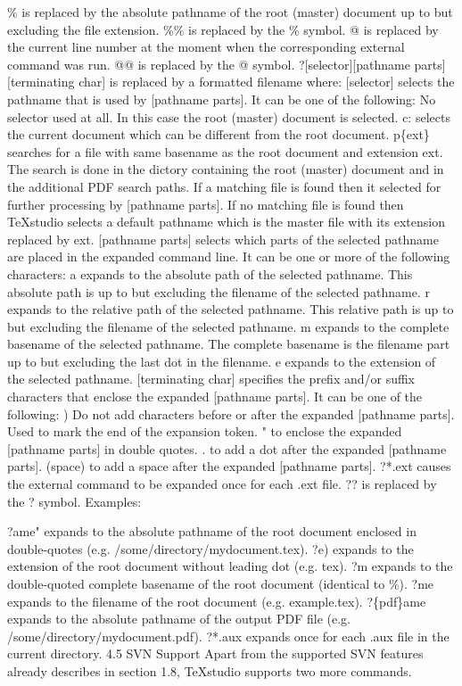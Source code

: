 \documentclass{article}
\begin{document}
	\% is replaced by the absolute pathname of the root (master) document up to but excluding the file extension.
	\%\% is replaced by the \% symbol.
	@ is replaced by the current line number at the moment when the corresponding external command was run.
	@@ is replaced by the @ symbol.
	?[selector][pathname parts][terminating char] is replaced by a formatted filename where:
	[selector] selects the pathname that is used by [pathname parts]. It can be one of the following:
	No selector used at all. In this case the root (master) document is selected.
	c: selects the current document which can be different from the root document.
	p\{ext\} searches for a file with same basename as the root document and extension ext. The search is done in the dictory containing the root (master) document and in the additional PDF search paths. If a matching file is found then it selected for further processing by [pathname parts]. If no matching file is found then TeXstudio selects a default pathname which is the master file with its extension replaced by ext.
	[pathname parts] selects which parts of the selected pathname are placed in the expanded command line. It can be one or more of the following characters:
	a expands to the absolute path of the selected pathname. This absolute path is up to but excluding the filename of the selected pathname.
	r expands to the relative path of the selected pathname. This relative path is up to but excluding the filename of the selected pathname.
	m expands to the complete basename of the selected pathname. The complete basename is the filename part up to but excluding the last dot in the filename.
	e expands to the extension of the selected pathname.
	[terminating char] specifies the prefix and/or suffix characters that enclose the expanded [pathname parts]. It can be one of the following:
	) Do not add characters before or after the expanded [pathname parts]. Used to mark the end of the expansion token.
	" to enclose the expanded [pathname parts] in double quotes.
	. to add a dot after the expanded [pathname parts].
	(space) to add a space after the expanded [pathname parts].
	?*.ext causes the external command to be expanded once for each .ext file.
	?? is replaced by the ? symbol.
	Examples:
	
	?ame" expands to the absolute pathname of the root document enclosed in double-quotes (e.g. /some/directory/mydocument.tex).
	?e) expands to the extension of the root document without leading dot (e.g. tex).
	?m expands to the double-quoted complete basename of the root document (identical to \%).
	?me expands to the filename of the root document (e.g. example.tex).
	?\{pdf\}ame expands to the absolute pathname of the output PDF file (e.g. /some/directory/mydocument.pdf).
	?*.aux expands once for each .aux file in the current directory.
	4.5 SVN Support
	Apart from the supported SVN features already describes in section 1.8, TeXstudio supports two more commands.
	
\end{document}
